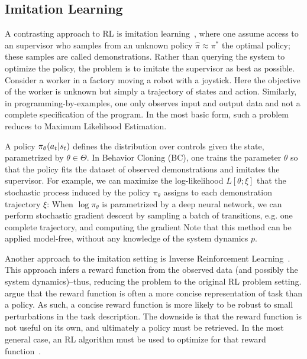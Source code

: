 \subsection{Imitation Learning}
A contrasting approach to RL is imitation learning~\cite{osa2018algorithmic}, where one assume access to an supervisor who samples from an unknown policy $\hat{\pi} \approx \pi^*$ the optimal policy; these samples are called demonstrations. Rather than querying the system to optimize the policy, the problem is to imitate the supervisor as best as possible.
 Consider a worker in a factory moving a robot with a joystick. Here the objective of the worker is unknown but simply a trajectory of states and action. Similarly, in programming-by-examples, one only observes input and output data and not a complete specification of the program. 
In the most basic form, such a problem reduces to Maximum Likelihood Estimation. 

A policy $\pi_\theta(a_t \vert s_t)$ defines the distribution over controls given the state, parametrized by $\theta\in\Theta$. In Behavior Cloning (BC), one trains the parameter $\theta$ so that the policy fits the dataset of observed demonstrations and imitates the supervisor. For example, we can maximize the log-likelihood $L[\theta;\xi]$ that the stochastic process induced by the policy $\pi_\theta$ assigns to each demonstration trajectory $\xi$:
When $\log\pi_\theta$ is parametrized by a deep neural network, we can perform stochastic gradient descent by sampling a batch of transitions, e.g. one complete trajectory, and computing the gradient
Note that this method can be applied model-free, without any knowledge of the system dynamics $p$.

Another approach to the imitation setting is Inverse Reinforcement Learning~\cite{abbeel2011inverse,ziebart2008maximum,ng2000algorithms}. This approach infers a reward function from the observed data (and possibly the system dynamics)--thus, reducing the problem to the original RL problem setting. \cite{abbeel2004apprenticeship} argue that the reward function is often a more concise representation of task than a policy. As such, a concise reward function is more likely to be robust to small perturbations in the task description. 
The downside is that the reward function is not useful on its own, and ultimately a policy must be retrieved. In the most general case, an RL algorithm must be used to optimize for that reward function~\cite{abbeel2004apprenticeship}.

